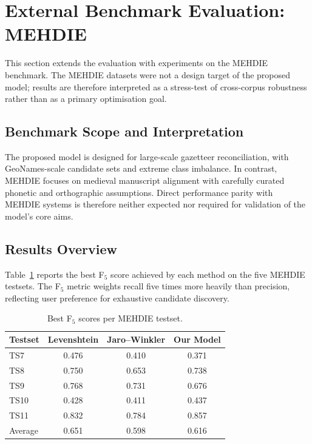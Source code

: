 \section{External Benchmark Evaluation: MEHDIE}

This section extends the evaluation with experiments on the MEHDIE benchmark.
The MEHDIE datasets were not a design target of the proposed model; results are therefore
interpreted as a stress-test of cross-corpus robustness rather than as a primary optimisation goal.

\subsection{Benchmark Scope and Interpretation}

The proposed model is designed for large-scale gazetteer reconciliation, with GeoNames-scale
candidate sets and extreme class imbalance. In contrast, MEHDIE focuses on medieval manuscript
alignment with carefully curated phonetic and orthographic assumptions. Direct performance parity
with MEHDIE systems is therefore neither expected nor required for validation of the model’s core aims.

\subsection{Results Overview}

Table~\ref{tab:mehdie_f5_best} reports the best F$_5$ score achieved by each method on the five MEHDIE
testsets. The F$_5$ metric weights recall five times more heavily than precision, reflecting user
preference for exhaustive candidate discovery.

\begin{table}[h]
\centering
\begin{tabular}{lccc}
\hline
Testset & Levenshtein & Jaro--Winkler & Our Model \\
\hline
TS7 & 0.476 & 0.410 & 0.371 \\
TS8 & 0.750 & 0.653 & 0.738 \\
TS9 & 0.768 & 0.731 & 0.676 \\
TS10 & 0.428 & 0.411 & 0.437 \\
TS11 & 0.832 & 0.784 & 0.857 \\
\hline
Average & 0.651 & 0.598 & 0.616 \\
\hline
\end{tabular}
\caption{Best F$_5$ scores per MEHDIE testset.}
\label{tab:mehdie_f5_best}
\end{table}

